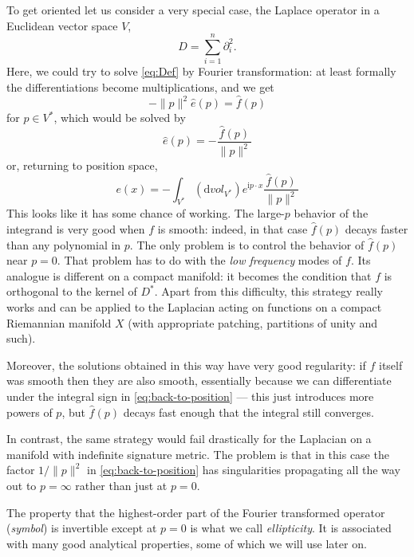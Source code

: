 \documentclass[12pt,letterpaper,reqno]{article}
\numberwithin{equation}{section}
\newcommand{\I}{{\mathrm i}}
\newcommand{\de}{\mathrm{d}}
\newcommand{\norm}[1]{\lVert#1\rVert}
\newcommand{\ti}[1]{\textit{#1}}
\begin{document}
To get oriented let us consider a very special case,
the Laplace operator in a Euclidean vector space $V$,
\begin{equation}
  D = \sum_{i=1}^n \partial_i^2.
\end{equation}
Here, we could try to solve \eqref{eq:Def}
by Fourier transformation:
at least formally the differentiations
become multiplications, and we get
\begin{equation}
  -\norm{p}^2 \hat{e}(p) = \hat{f}(p)
\end{equation}
for $p \in V^*$, which would be solved by
\begin{equation}
  \hat e(p) = -\frac{\hat{f}(p)}{\norm{p}^2}
\end{equation}
or, returning to position space,
\begin{equation} \label{eq:back-to-position}
  e(x) = -\int_{V^*} (\de vol_{V^*}) e^{\I p \cdot x} \frac{\hat{f}(p)}{\norm{p}^2}
\end{equation}
This looks like it has some chance of working.
The large-$p$ behavior of the integrand is very good when $f$
is smooth: indeed, in that case $\hat f(p)$ decays faster
than any polynomial in $p$.
The only problem is to control
the behavior of $\hat f(p)$ near $p=0$.
That problem has to do with the \ti{low frequency} modes of $f$.
Its analogue is different on a compact manifold: it becomes the
condition that $f$ is orthogonal to the kernel of $D^*$. Apart
from this difficulty, this strategy really works and can be applied
to the Laplacian acting on functions on a compact Riemannian manifold $X$
(with appropriate patching, partitions of unity and
such).

Moreover, the solutions obtained in this
way have very good regularity: if $f$ itself was smooth then they are also
smooth, essentially because we can differentiate under the integral sign in
\eqref{eq:back-to-position} --- this just introduces more powers of
$p$, but $\hat f(p)$ decays fast enough that the integral still
converges.

In contrast, the same strategy would fail drastically for the
Laplacian on a manifold with indefinite signature metric.
The problem is that in this case the factor $1 / \norm{p}^2$
in \eqref{eq:back-to-position} has singularities propagating
all the way out to $p = \infty$ rather than just at $p=0$.

The property that the highest-order part of the
Fourier transformed operator (\ti{symbol}) is invertible except
at $p=0$ is what we call \ti{ellipticity}. It is associated
with many good analytical properties, some of which we will
use later on.
\end{document}
